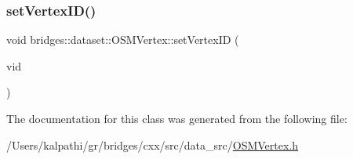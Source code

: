 \subsubsection{\texorpdfstring{setVertexID()}{setVertexID()}}
{\footnotesize\ttfamily void bridges\+::dataset\+::\+O\+S\+M\+Vertex\+::set\+Vertex\+ID (\begin{DoxyParamCaption}\item[{\mbox{\hyperlink{classbridges_1_1dataset_1_1_o_s_m_vertex_ad166f13b0aefbdc05a273546f2a3bb96}{O\+S\+M\+Vertex\+ID}}}]{vid }\end{DoxyParamCaption})\hspace{0.3cm}{\ttfamily [inline]}}



The documentation for this class was generated from the following file\+:\begin{DoxyCompactItemize}
\item 
/\+Users/kalpathi/gr/bridges/cxx/src/data\+\_\+src/\mbox{\hyperlink{_o_s_m_vertex_8h}{O\+S\+M\+Vertex.\+h}}\end{DoxyCompactItemize}
